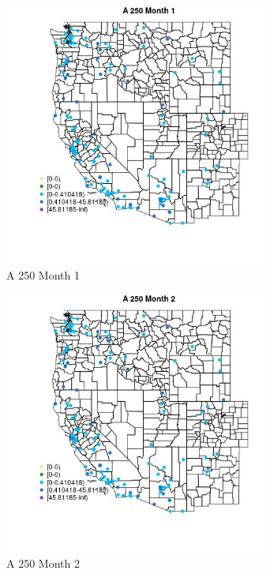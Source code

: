 \begin{figure} 
\centering  
\includegraphics[width=0.77\textwidth]{Code_Outputs/Report_ML_input_PM25_Step4_part_e_de_duplicated_aves_MapObsMo1A_250.jpg} 
\caption{\label{fig:Report_ML_input_PM25_Step4_part_e_de_duplicated_avesMapObsMo1A_250}A 250 Month 1} 
\end{figure} 
 

\clearpage 

\begin{figure} 
\centering  
\includegraphics[width=0.77\textwidth]{Code_Outputs/Report_ML_input_PM25_Step4_part_e_de_duplicated_aves_MapObsMo2A_250.jpg} 
\caption{\label{fig:Report_ML_input_PM25_Step4_part_e_de_duplicated_avesMapObsMo2A_250}A 250 Month 2} 
\end{figure} 
 

